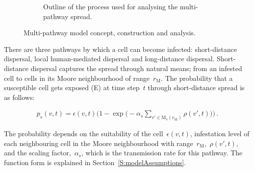 \documentclass[11pt]{article}
\newcommand{\infest}{\rho}
\newcommand{\suitable}{\epsilon}
\newcommand{\pshort}{p_s}
\newcommand{\asd}{\alpha_s}
\newcommand{\moore}{\mathrm{M}}
\newcommand{\mooreRange}{r_\mathrm{M}}
\theoremstyle{definition}
\begin{document}
\begin{figure}[t]
\begin{subfigure}[b]{.8\textwidth}
    \caption{Outline of the process used for analysing the multi-pathway spread. \label{fig:clusterOutline}}
\end{subfigure}
\caption{Multi-pathway model concept, construction and analysis.}
\end{figure}

There are three pathways by which a cell can become infected:
short-distance dispersal, local human-mediated dispersal and long-distance
dispersal. Short-distance dispersal captures the spread through natural
means; from an infested cell to cells in its Moore neighbourhood of
range~$\mooreRange$.  The probability that a susceptible cell gets exposed
(E) at time step~$t$ through short-distance spread is as follows:
\begin{linenomath}
\begin{align}\label{eqn:pshort}
    \pshort(v,t)=\suitable(v,t)\bigg(1-
    \exp\Big(-\asd\sum_{v'\in\moore_v(\mooreRange)}\infest(v',t)\Big)\bigg)\,.
\end{align}
\end{linenomath}
The probability depends on the suitability of the cell~$\suitable(v,t)$,
infestation level of each neighbouring cell in the Moore neighbourhood with
range~$\mooreRange$,~$\infest(v',t)$, and the scaling factor,~$\asd$, which
is the transmission rate for this pathway. The function form is explained
in Section~\ref{S:modelAssumptions}.
\end{document}
